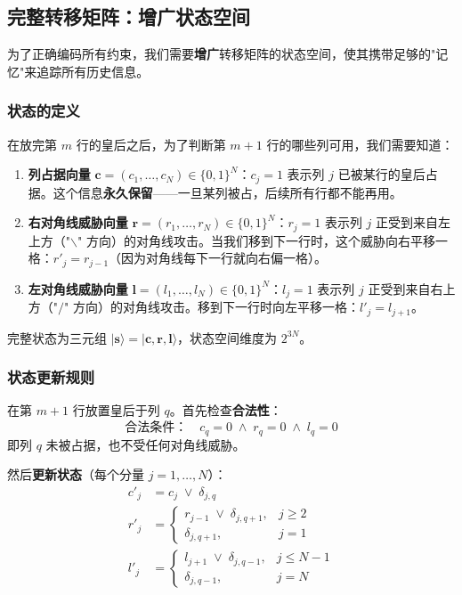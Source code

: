 \documentclass[12pt,a4paper]{ctexart}
\begin{document}
\subsection{完整转移矩阵：增广状态空间}

为了正确编码所有约束，我们需要\textbf{增广}转移矩阵的状态空间，使其携带足够的"记忆"来追踪所有历史信息。

\subsubsection{状态的定义}

在放完第 $m$ 行的皇后之后，为了判断第 $m+1$ 行的哪些列可用，我们需要知道：

\begin{enumerate}
    \item \textbf{列占据向量} $\mathbf{c} = (c_1, \ldots, c_N) \in \{0,1\}^N$：$c_j = 1$ 表示列 $j$ 已被某行的皇后占据。这个信息\textbf{永久保留}——一旦某列被占，后续所有行都不能再用。

    \item \textbf{右对角线威胁向量} $\mathbf{r} = (r_1, \ldots, r_N) \in \{0,1\}^N$：$r_j = 1$ 表示列 $j$ 正受到来自左上方（"$\backslash$" 方向）的对角线攻击。当我们移到下一行时，这个威胁向右平移一格：$r'_j = r_{j-1}$（因为对角线每下一行就向右偏一格）。

    \item \textbf{左对角线威胁向量} $\mathbf{l} = (l_1, \ldots, l_N) \in \{0,1\}^N$：$l_j = 1$ 表示列 $j$ 正受到来自右上方（"$/$" 方向）的对角线攻击。移到下一行时向左平移一格：$l'_j = l_{j+1}$。
\end{enumerate}

完整状态为三元组 $|\mathbf{s}\rangle = |\mathbf{c}, \mathbf{r}, \mathbf{l}\rangle$，状态空间维度为 $2^{3N}$。

\subsubsection{状态更新规则}

在第 $m+1$ 行放置皇后于列 $q$。首先检查\textbf{合法性}：
\begin{equation}
\text{合法条件：} \quad c_q = 0 \;\wedge\; r_q = 0 \;\wedge\; l_q = 0
\end{equation}
即列 $q$ 未被占据，也不受任何对角线威胁。

然后\textbf{更新状态}（每个分量 $j = 1, \ldots, N$）：
\begin{align}
c'_j &= c_j \;\lor\; \delta_{j,q} \label{eq:col_update} \\
r'_j &= \begin{cases} r_{j-1} \;\lor\; \delta_{j, q+1}, & j \geq 2 \\ \delta_{j, q+1}, & j = 1 \end{cases} \label{eq:rdiag_update} \\
l'_j &= \begin{cases} l_{j+1} \;\lor\; \delta_{j, q-1}, & j \leq N-1 \\ \delta_{j, q-1}, & j = N \end{cases} \label{eq:ldiag_update}
\end{align}
\end{document}
